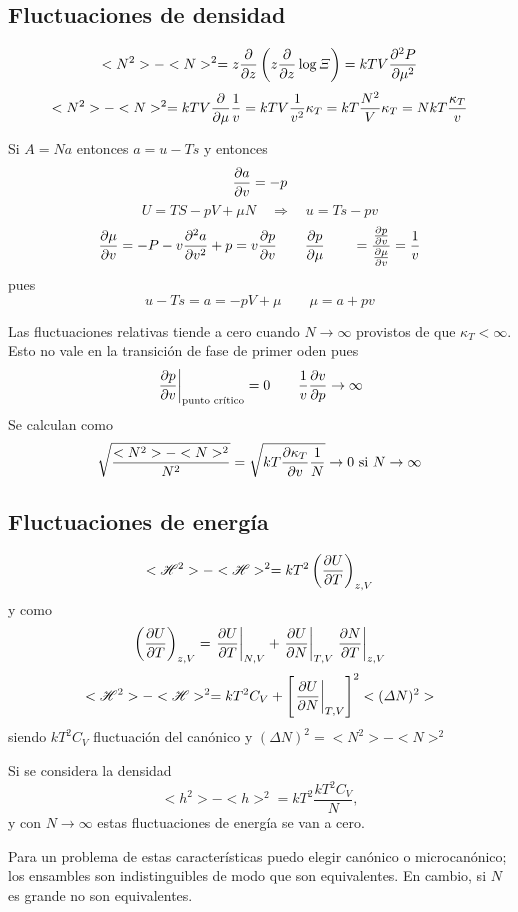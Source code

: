 \documentclass[10pt,oneside]{CBFT_book}
\begin{document}
\subsection{Fluctuaciones de densidad}

\[
	<N^2> - <N>^2 =  z\dpar{}{z}\left( z\dpar{}{z} \log \Xi \right)= kTV \dpar[2]{P}{\mu}
\]
\[
	<N^2> - <N>^2 = kTV \dpar{}{\mu}\frac{1}{v} = kTV \frac{1}{v^2}\kappa_T = kT\frac{N^2}{V}\kappa_T 
	= NkT \frac{\kappa_T}{v}
\]

Si $A=Na$ entonces $a=u-Ts$ y entonces 
\[
	\dpar{a}{v} = -p
\]
\[
	U = TS-pV+\mu N \quad \Rightarrow \quad u = Ts - pv
\]
\[
	\dpar{\mu}{v} = -P -v\dpar[2]{a}{v} + p = v \dpar{p}{v} \qquad \dpar{p}{\mu} \qquad 
			= \frac{\dpar{p}{v}}{\dpar{\mu}{v}}=\frac{1}{v}
\]
pues 
\[
	u - Ts = a = - pV + \mu \qquad \mu = a + pv
\]

Las fluctuaciones relativas tiende a cero cuando $N\to\infty$ provistos de que $\kappa_T < \infty$. Esto no vale 
en la transición de fase de primer oden pues 
\[
	\left. \dpar{p}{v} \right|_{\text{punto crítico}} = 0 \qquad \frac{1}{v} \dpar{v}{p} \to \infty
\]
Se calculan como 
\[
	\sqrt{\frac{<N^2> - <N>^2}{N^2}} = \sqrt{ kT\dpar{\kappa_T}{v}\frac{1}{N}} \to 0 \text{ si } N\to\infty
\]

\subsection{Fluctuaciones de energía}

\[
	<\Ham^2> - <\Ham>^2 = kT^2 \left( \dpar{U}{T} \right)_{z,V}
\]
y como 
\[
	\left( \dpar{U}{T} \right)_{z,V} = \left.\dpar{U}{T}\right|_{N,V} + \left.\dpar{U}{N}\right|_{T,V} 
	\left.\dpar{N}{T}\right|_{z,V}
\]
\[
	<\Ham^2> - <\Ham>^2 = kT^2C_V +  \left[\left. \dpar{U}{N} \right|_{T,V}\right]^2 <(\Delta N)^2>
\]
siendo $ kT^2C_V $ fluctuación del canónico y $(\Delta N)^2 = <N^2> - <N>^2 $

Si se considera la densidad
\[
	< h^2 > - < h >^2 = kT^2 \frac{k T^2 C_V}{N}, 
\]
y con $ N \to \infty $ estas fluctuaciones de energía se van a cero.

Para un problema de estas características puedo elegir canónico o microcanónico; los ensambles son
indistinguibles de modo que son equivalentes. En cambio, si $N$ es grande no son equivalentes.
\end{document}
